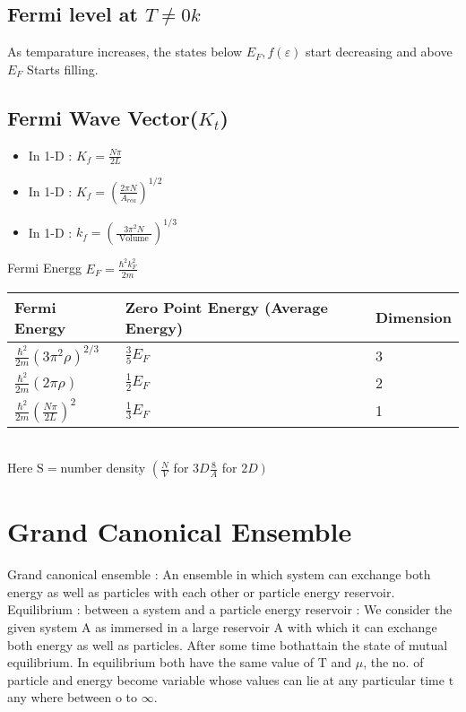 \subsection{Fermi level at $T \neq 0 k$}
As temparature increases, the states below $E_{F}, f(\varepsilon)$ start decreasing and above $E_{F}$ Starts filling.
\subsection{Fermi Wave Vector($K_t$)}
\begin{itemize}
	\item In 1-D : $K_{f}=\frac{N \pi}{2 L}$
	\item  In 1-D : $K_{f}=\left(\frac{2 \pi N}{A_{r e a}}\right)^{1 / 2}$
	\item  In 1-D : $k_{f}=\left(\frac{3 \pi^{2} N}{\text { Volume }}\right)^{1 / 3}$
\end{itemize}
Fermi Energg $E_{F}=\frac{\hbar^{2} k_{F}^{2}}{2 m}$\\
\renewcommand*{\arraystretch}{2}
\begin{tabular}{|p{4cm}|p{4cm}|p{3cm}|}
	\hline
	Fermi Energy&Zero Point Energy (Average Energy)&Dimension\\\hline
	$\frac{\hbar^{2}}{2 m}\left(3 \pi^{2} \rho\right)^{2 / 3}$&$\frac{3}{5} E_{F}$&3\\
	$\frac{\hbar^{2}}{2 m}(2 \pi \rho)$&$\frac{1}{2} E_{F}$&2\\
	$\frac{\hbar^{2}}{2 m}\left(\frac{N \pi}{2 L}\right)^{2}$&$\frac{1}{3} E_{F}$& 1\\\hline
\end{tabular}\\
Here $\mathrm{S}=$number density $\left(\frac{N}{V}\right.$ for $3 D \frac{8}{A}$ for $\left.2 D\right)$
\section{Grand Canonical Ensemble}
Grand canonical ensemble : An ensemble in which system can exchange both energy as well as particles with each other or particle energy reservoir.\\
Equilibrium : between a system and a particle energy reservoir :
We consider the given system A as immersed in a large reservoir A with which it can exchange both energy as well as particles. After some time bothattain the state of mutual equilibrium. In equilibrium both have the same value of $\mathrm{T}$ and $\mu$, the no. of particle and energy become variable whose values can lie at any particular time $\mathrm{t}$ any where between o to $\infty$. 


